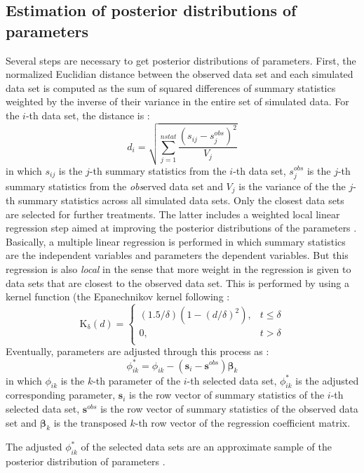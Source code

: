 \subsection{Estimation of posterior distributions of parameters}
Several steps are necessary to get posterior distributions of
parameters. First, the normalized Euclidian distance between the observed data set and
each simulated data set is computed as the sum of squared
differences of summary statistics weighted by the inverse of their
variance in the entire set of simulated data. For the $i$-th data set,
the distance is :
\begin{equation}\label{eq1}
    d_i=\sqrt{\sum_{j=1}^{nstat}\frac{(s_{ij}-s_j^{obs})^2}{V_j}}
\end{equation}
in which $s_{ij}$ is the $j$-th summary statistics from the $i$-th
data set, $s_j^{obs}$ is the $j$-th summary statistics from the
\emph{obs}erved data set and $V_j$ is the variance of the the $j$-th
summary statistics across all simulated data sets.
 Only the closest data sets are selected for further
treatments. The latter includes a weighted local linear regression step aimed
at improving the posterior distributions of the parameters \citep{B2002}. Basically, a
multiple linear regression is performed in which summary statistics
are the independent variables and parameters the dependent
variables. But this regression is also \emph{local} in the sense
that more weight in the regression is given to data sets that are
closest to the observed data set. This is performed by using a
kernel function (the Epanechnikov kernel following \citet{B2002} :
\begin{equation}
\operatorname{K_{\delta}}(d) = \left\{
\begin{array}{ll}
(1.5/\delta)(1-(d/\delta)^2), & t \leq \delta \\
0, & t > \delta \\
\end{array}\right.
\end{equation}
Eventually, parameters are adjusted through this process as :
\begin{equation}\label{eq2}
    \phi_{ik}^*=\phi_{ik}-(\textbf{s}_i-\textbf{s}^{obs})\bm{\beta}_k
\end{equation}
in which $\phi_{ik}$ is the $k$-th parameter of the $i$-th selected
data set, $\phi_{ik}^*$ is the adjusted corresponding parameter,
$\textbf{s}_i$ is the row vector of summary statistics of the $i$-th
selected data set, $\textbf{s}^{obs}$ is the row vector of summary
statistics of the observed data set and $\bm{\beta}_k$ is the
transposed $k$-th row vector of the regression coefficient
matrix.\par The adjusted $\phi_{ik}^*$ of the selected data sets are
an approximate sample of the posterior distribution of parameters \citep{B2002}.

